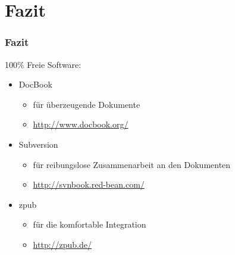 \documentclass{beamer}
\begin{document}
\section{Fazit}

\begin{frame}
\frametitle{Fazit}
\begin{block}{ 100\% Freie Software: }
\begin{itemize}
\item DocBook
\begin{itemize}
\item für überzeugende Dokumente
\item \url{http://www.docbook.org/}
\end{itemize}
\item Subversion
\begin{itemize}
\item für reibungslose Zusammenarbeit an den Dokumenten
\item \url{http://svnbook.red-bean.com/}
\end{itemize}
\item zpub
\begin{itemize}
\item für die komfortable Integration
\item \url{http://zpub.de/}
\end{itemize}
\end{itemize}
\end{block}
\end{frame}



\end{document}

